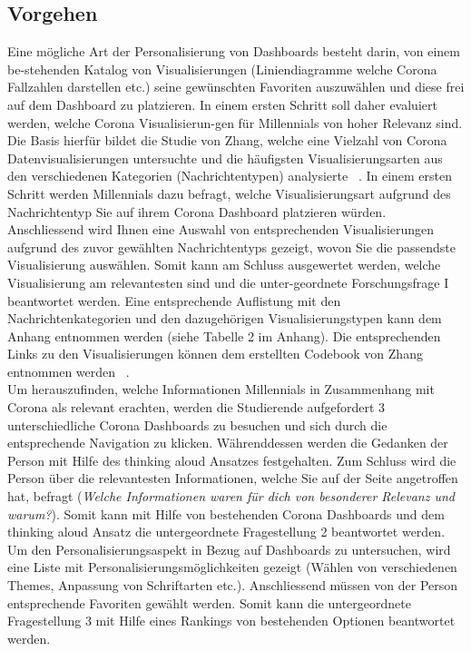 \documentclass[12pt, oneside]{article}
\begin{document}
\clearpage
\subsection{Vorgehen}
Eine mögliche Art der Personalisierung von Dashboards besteht darin, von einem be-stehenden Katalog von Visualisierungen (Liniendiagramme welche Corona Fallzahlen darstellen etc.) seine gewünschten Favoriten auszuwählen und diese frei auf dem Dashboard zu platzieren. In einem ersten Schritt soll daher evaluiert werden, welche Corona Visualisierun-gen für Millennials von hoher Relevanz sind. Die Basis hierfür bildet die Studie von Zhang, welche eine Vielzahl von Corona Datenvisualisierungen untersuchte und die häufigsten Visualisierungsarten aus den verschiedenen Kategorien (Nachrichtentypen) analysierte ~\citep{YixuanZhang.}. In einem ersten Schritt werden Millennials dazu befragt, welche Visualisierungsart aufgrund des Nachrichtentyp Sie auf ihrem Corona Dashboard platzieren würden. Anschliessend wird Ihnen eine Auswahl von entsprechenden Visualisierungen aufgrund des zuvor gewählten Nachrichtentyps gezeigt, wovon Sie die passendste Visualisierung auswählen. Somit kann am Schluss ausgewertet werden, welche Visualisierung am relevantesten sind und die unter-geordnete Forschungsfrage I beantwortet werden. Eine entsprechende Auflistung mit den Nachrichtenkategorien und den dazugehörigen Visualisierungstypen kann dem Anhang entnommen werden (siehe Tabelle 2 im Anhang). Die entsprechenden Links zu den Visualisierungen können dem erstellten Codebook von Zhang entnommen werden ~\citep{YixuanZhang.2021}.\\

Um herauszufinden, welche Informationen Millennials in Zusammenhang mit Corona als relevant erachten, werden die Studierende aufgefordert 3 unterschiedliche Corona Dashboards zu besuchen und sich durch die entsprechende Navigation zu klicken. Währenddessen werden die Gedanken der Person mit Hilfe des thinking aloud Ansatzes festgehalten. Zum Schluss wird die Person über die relevantesten Informationen, welche Sie auf der Seite angetroffen hat, befragt (\textit{Welche Informationen waren für dich von besonderer Relevanz und warum?}). Somit kann mit Hilfe von bestehenden Corona Dashboards und dem thinking aloud Ansatz die untergeordnete Fragestellung 2 beantwortet werden.\\

Um den Personalisierungsaspekt in Bezug auf Dashboards zu untersuchen, wird eine Liste mit Personalisierungsmöglichkeiten gezeigt (Wählen von verschiedenen Themes, Anpassung von Schriftarten etc.). Anschliessend müssen von der Person entsprechende Favoriten gewählt werden. Somit kann die untergeordnete Fragestellung 3 mit Hilfe eines Rankings von bestehenden Optionen beantwortet werden.
\end{document}
